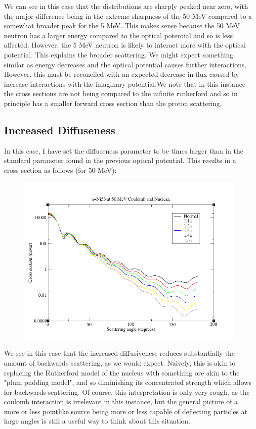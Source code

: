 \documentclass[paper=a4, fontsize=11pt]{scrartcl} %
\numberwithin{equation}{section} %
\numberwithin{figure}{section} %
\numberwithin{table}{section} %
\begin{document}
We can see in this case that the distributions are sharply peaked near zero, with the major difference being in the extreme sharpness of the 50 MeV compared to a somewhat  broader peak for the 5 MeV. This makes sense because the 50 MeV neutron has a larger energy compared to the optical potential and so is less affected. However, the 5 MeV neutron  is likely to interact more with the optical potential. This explains the broader scattering. We might expect something similar as energy decreases and the optical potential causes further interactions. However, this must be reconciled with an expected decrease in flux caused by increase interactions with the imaginary potential.We note that in this instance the cross sections are not being compared to the infinite rutherford and so in principle has a smaller forward cross section than the proton scattering. \\

\subsection{Increased Diffuseness}

In this case, I have set the diffuseness parameter to be times larger than in the standard parameter found in the previous optical potential. This results in a cross section as follows (for 50 MeV):\\
\begin{figure}[!hbt]
\centering
\includegraphics[width=.6\textwidth]{NeutronDiff.png}
\end{figure}

We see in this case that the increased diffusiveness reduces substantially the amount of backwards scattering, as we would expect. Naively, this is akin to replacing the Rutherford model of the nucleus with something ore akin to the "plum pudding model", and so diminishing its concentrated strength which allows for backwards scattering. Of course, this interpretation is only very rough, as the coulomb interaction is irrelevant in this instance, but the general picture of a more or less pointlike source being more or less capable of deflecting particles at large angles is still a useful way to think about this situation.\\
\end{document}
